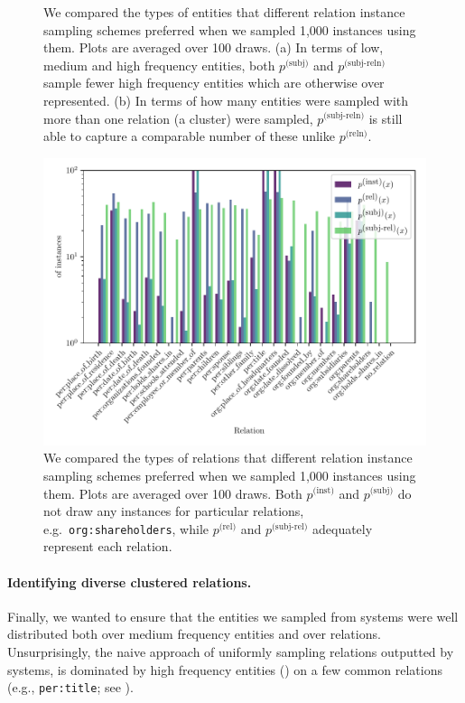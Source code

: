 \begin{figure}
  \caption[Comparison of relation sampling schemes on their entity distributions]{\label{fig:kbpo:selective-supervised}
  We compared the types of entities that different relation instance sampling schemes preferred when we sampled 1,000 instances using them.
  Plots are averaged over 100 draws.
  (a) In terms of low, medium and high frequency entities, both $p^{\text{(subj)}}$ and $p^{\text{(subj-reln)}}$ sample fewer high frequency entities which are otherwise over represented.
  (b) In terms of how many entities were sampled with more than one relation (a cluster) were sampled, $p^{\text{(subj-reln)}}$ is still able to capture a comparable number of these unlike $p^{\text{(reln)}}$.
  }
\end{figure}

\begin{figure}
  \centering
  \includegraphics[width=0.9\textheight, angle=-90]{figures/analysis/selective_supervised_relations}
  \caption[Comparison of relation sampling schemes on their relation distributions]{\label{fig:kbpo:selective-supervised-relation}
  We compared the types of relations that different relation instance sampling schemes preferred when we sampled 1,000 instances using them.
  Plots are averaged over 100 draws.
  Both $p^{\text{(inst)}}$ and $p^{\text{(subj)}}$ do not draw any instances for particular relations, e.g.\ \texttt{org:shareholders}, while
  $p^{\text{(rel)}}$ and $p^{\text{(subj-rel)}}$ adequately represent each relation.
  }
\end{figure}

\paragraph{Identifying diverse clustered relations.}
Finally, we wanted to ensure that the entities we sampled from systems were well distributed both over medium frequency entities and over relations.
Unsurprisingly, the naive approach of uniformly sampling relations outputted by systems, is dominated by  high frequency entities () on a few common relations (e.g., \texttt{per:title}; see ).

